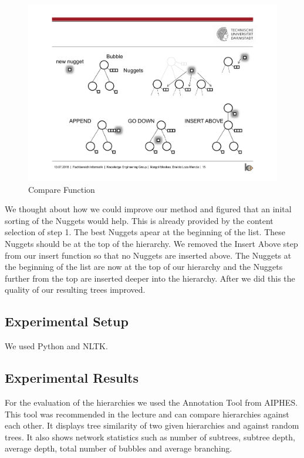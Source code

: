 \begin{figure}[H]
	\centering
	\includegraphics[trim=22.5cm 12.5cm 2.5cm 5.5cm, clip=true]{img/step2_func.pdf}
	\caption{Compare Function}
	\label{fig:jsd}
\end{figure}


We thought about how we could improve our method and figured that an inital sorting of the Nuggets would help. This is already provided by the content selection of step 1. The best Nuggets apear at the beginning of the list. These Nuggets should be at the top of the hierarchy. We removed the Insert Above step from our insert function so that no Nuggets are inserted above. The Nuggets at the beginning of the list are now at the top of our hierarchy and the Nuggets further from the top are inserted deeper into the hierarchy. After we did this the quality of our resulting trees improved.

\subsection{Experimental Setup}

We used Python and NLTK.

\subsection{Experimental Results}


For the evaluation of the hierarchies we used the Annotation Tool from AIPHES. This tool was recommended in the lecture and can compare hierarchies against each other. It displays tree similarity of two given hierarchies and against random trees. It also shows network statistics such as number of subtrees, subtree depth, average depth, total number of bubbles and average branching.

